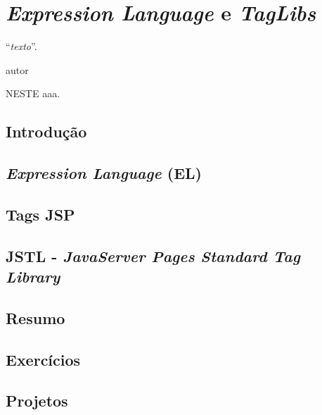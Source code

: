 \chapter{\textit{Expression Language} e \textit{TagLibs}}
\epigraph{``\textit{texto}''.}{autor}

\lettrine[lines=4, lhang=0.1, lraise=0, loversize=0.2, findent=0.1em]{\textcolor{corAzulTema}{N}}{ESTE} aaa.

\section{Introdução}

\section{\textit{Expression Language} (EL)}

\section{Tags JSP}

\section{JSTL - \textit{JavaServer Pages Standard Tag Library}}

\section{Resumo}

\section{Exercícios}

\section{Projetos}